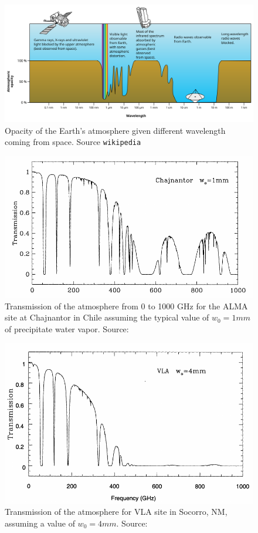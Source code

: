 \begin{figure}[htbp]
\includegraphics[width=\textwidth]{images/Atmospheric_electromagnetic_opacity}
\caption{Opacity of the Earth's atmosphere given different wavelength coming from space. Source \texttt{wikipedia}}
\label{fig:atmospheric-opacity}
\end{figure}

\begin{figure}[]
\includegraphics[width=\textwidth]{images/chajnantor-atm-transmission}
\caption{Transmission of the atmosphere from 0 to 1000 GHz for the ALMA site at Chajnantor in Chile assuming the typical value of $w_0 = 1 mm$ of precipitate water vapor. Source: \cite{taylor99}}
\label{fig:chaj-atm-tx}
\end{figure}

\begin{figure}[]
\includegraphics[width=\textwidth]{images/vla-atm-transmission}
\caption{Transmission of the atmosphere for VLA site in Socorro, NM, assuming a value of $w_0 = 4 mm$. Source: \cite{taylor99}}
\label{fig:vla-atm-tx}
\end{figure}

